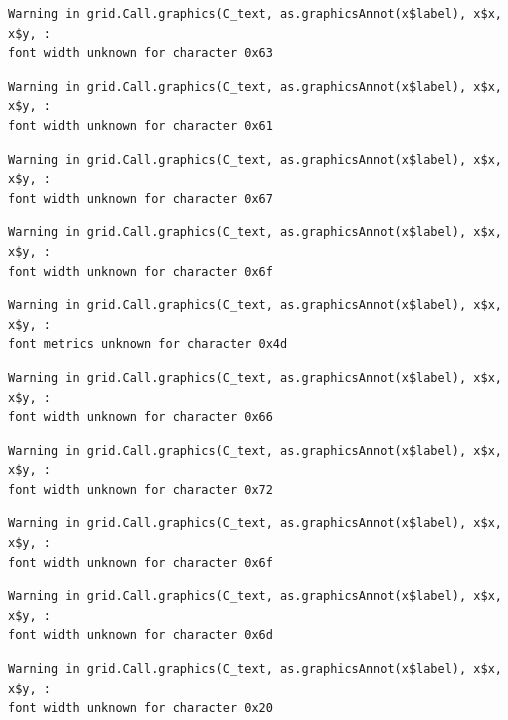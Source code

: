 \documentclass[
  letterpaper,
]{scrbook}
\begin{document}
\begin{verbatim}
Warning in grid.Call.graphics(C_text, as.graphicsAnnot(x$label), x$x, x$y, :
font width unknown for character 0x63
\end{verbatim}

\begin{verbatim}
Warning in grid.Call.graphics(C_text, as.graphicsAnnot(x$label), x$x, x$y, :
font width unknown for character 0x61
\end{verbatim}

\begin{verbatim}
Warning in grid.Call.graphics(C_text, as.graphicsAnnot(x$label), x$x, x$y, :
font width unknown for character 0x67
\end{verbatim}

\begin{verbatim}
Warning in grid.Call.graphics(C_text, as.graphicsAnnot(x$label), x$x, x$y, :
font width unknown for character 0x6f
\end{verbatim}

\begin{verbatim}
Warning in grid.Call.graphics(C_text, as.graphicsAnnot(x$label), x$x, x$y, :
font metrics unknown for character 0x4d
\end{verbatim}

\begin{verbatim}
Warning in grid.Call.graphics(C_text, as.graphicsAnnot(x$label), x$x, x$y, :
font width unknown for character 0x66
\end{verbatim}

\begin{verbatim}
Warning in grid.Call.graphics(C_text, as.graphicsAnnot(x$label), x$x, x$y, :
font width unknown for character 0x72
\end{verbatim}

\begin{verbatim}
Warning in grid.Call.graphics(C_text, as.graphicsAnnot(x$label), x$x, x$y, :
font width unknown for character 0x6f
\end{verbatim}

\begin{verbatim}
Warning in grid.Call.graphics(C_text, as.graphicsAnnot(x$label), x$x, x$y, :
font width unknown for character 0x6d
\end{verbatim}

\begin{verbatim}
Warning in grid.Call.graphics(C_text, as.graphicsAnnot(x$label), x$x, x$y, :
font width unknown for character 0x20
\end{verbatim}
\end{document}
